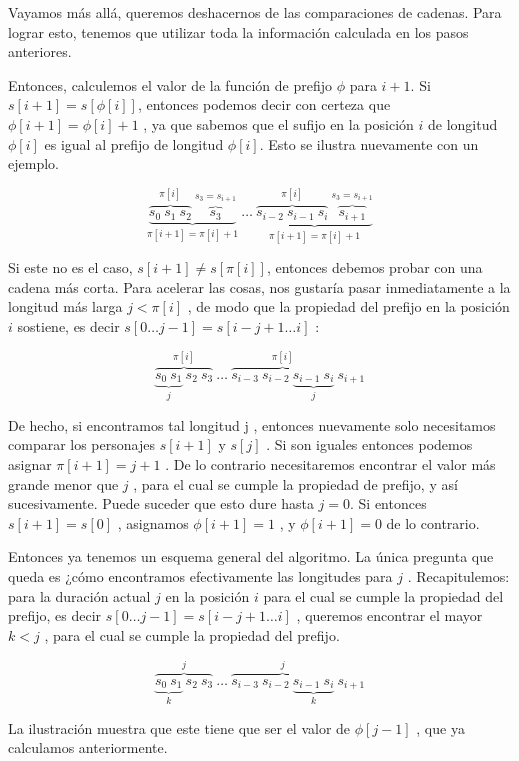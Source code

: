 Vayamos más allá, queremos deshacernos de las comparaciones de cadenas. Para lograr esto, tenemos que utilizar toda la información calculada en
los pasos anteriores.

Entonces, calculemos el valor de la función de prefijo $\phi$ para $i+1$. Si $s[i+1]= s[\phi[i]]$, entonces podemos decir con certeza que
$\phi[i + 1] = \phi[i] + 1$ , ya que sabemos que el sufijo en la posición $i$ de longitud $\phi[i]$ es igual al prefijo de longitud $\phi[i]$. Esto se ilustra nuevamente con un ejemplo.

$$\underbrace{\overbrace{s_0 ~ s_1 ~ s_2}^{\pi[i]} ~ \overbrace{s_3}^{s_3 = s_{i+1}}}_{\pi[i+1] = \pi[i] + 1} ~ \dots ~ \underbrace{\overbrace{s_{i-2} ~ s_{i-1} ~ s_{i}}^{\pi[i]} ~ \overbrace{s_{i+1}}^{s_3 = s_{i + 1}}}_{\pi[i+1] = \pi[i] + 1}$$


Si este no es el caso, $s[i+1] \neq s[\pi[i]]$, entonces debemos probar con una cadena más corta. Para acelerar las cosas, nos gustaría pasar
inmediatamente a la longitud más larga $j < \pi[i]$ , de modo que la propiedad del prefijo en la posición $i$ sostiene, es decir
$s[0 \dots j-1] = s[i-j+1 \dots i]$ :

$$\overbrace{\underbrace{s_0 ~ s_1}_j ~ s_2 ~ s_3}^{\pi[i]} ~ \dots ~ \overbrace{s_{i-3} ~ s_{i-2} ~ \underbrace{s_{i-1} ~ s_{i}}_j}^{\pi[i]} ~ s_{i+1}$$


De hecho, si encontramos tal longitud j , entonces nuevamente solo necesitamos comparar los personajes $s[i + 1]$ y $s[j]$ . Si son iguales entonces
podemos asignar $\pi[i+1] = j + 1$ . De lo contrario necesitaremos encontrar el valor más grande menor que $j$ , para el cual se cumple la propiedad
de prefijo, y así sucesivamente. Puede suceder que esto dure hasta $j = 0$. Si entonces $s[i + 1] = s[0]$ , asignamos $\phi[i + 1] = 1$ , y $\phi[i + 1] = 0$ de
lo contrario.


Entonces ya tenemos un esquema general del algoritmo. La única pregunta que queda es ¿cómo encontramos efectivamente las longitudes para $j$ .
Recapitulemos: para la duración actual $j$ en la posición $i$ para el cual se cumple la propiedad del prefijo, es decir $s[0 \dots j-1] = s[i-j+1 \dots i]$ ,
queremos encontrar el mayor $k < j$ , para el cual se cumple la propiedad del prefijo.

$$\overbrace{\underbrace{s_0 ~ s_1}_k ~ s_2 ~ s_3}^j ~ \dots ~ \overbrace{s_{i-3} ~ s_{i-2} ~ \underbrace{s_{i-1} ~ s_{i}}_k}^j ~s_{i+1}$$

La ilustración muestra que este tiene que ser el valor de $\phi[j-1]$ , que ya calculamos anteriormente.